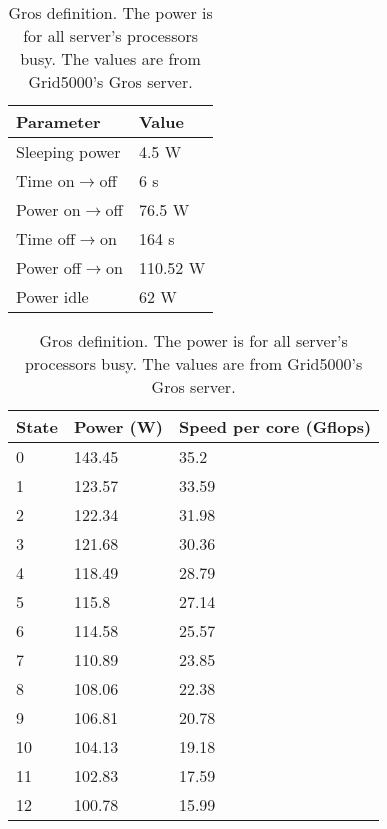 \begin{table}[!htb]
    \caption{Gros definition. The power is for all server's processors busy. The values are from Grid5000's Gros server.}
    \label{tab:gros}
    \begin{minipage}{.45\linewidth}
      \centering
      \begin{tabular}{l|l}
        \hline
        Parameter & Value \\ \hline\hline
        Sleeping power & 4.5 W \\
        Time on$\rightarrow$off & 6 s \\
        Power on$\rightarrow$off & 76.5 W \\
        Time off$\rightarrow$on & 164 s \\
        Power off$\rightarrow$on & 110.52 W \\
        Power idle & 62 W \\ \hline
    \end{tabular}
    \end{minipage}%
    \begin{minipage}{.55\linewidth}
      \centering
      \begin{tabular}{l|l|l}
        \hline
        State & Power (W) & Speed per core (Gflops) \\ \hline\hline
        0 & 143.45 & 35.2 \\
        1 & 123.57 & 33.59 \\
        2 & 122.34 & 31.98 \\
        3 & 121.68 & 30.36 \\
        4 & 118.49 & 28.79 \\
        5 & 115.8 & 27.14 \\
        6 & 114.58 & 25.57 \\
        7 & 110.89 & 23.85 \\
        8 & 108.06 & 22.38 \\
        9 & 106.81 & 20.78 \\
        10 & 104.13 & 19.18 \\
        11 & 102.83 & 17.59 \\
        12 & 100.78 & 15.99 \\ \hline
    \end{tabular}
    \end{minipage} 
\end{table}